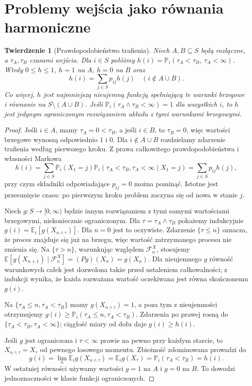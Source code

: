 \documentclass[11pt,a4paper,oneside]{report}
\numberwithin{equation}{chapter}
\theoremstyle{plain}
\newtheorem{twierdzenie}{Twierdzenie}[chapter]
\theoremstyle{definition}
\theoremstyle{remark}
\newcommand{\Prob}{\mathbb{P}}
\newcommand{\E}{\mathbb{E}}
\begin{document}
\section{Problemy wejścia jako równania harmoniczne}

\begin{twierdzenie}[Prawdopodobieństwo trafienia]
Niech $A,B\subseteq S$ będą rozłączne, a
$\tau_A,\tau_B$ czasami wejścia.
Dla $i\in S$ połóżmy
$h(i)=\Prob_i(\tau_A<\tau_B,\ \tau_A<\infty)$.
Wtedy $0\leq h\leq1$, $h=1$ na $A$,
$h=0$ na $B$ oraz
\[
h(i)=\sum_{j\in S}p_{ij}h(j)
\quad(i\notin A\cup B).
\]
Co więcej, $h$ jest \emph{najmniejszą}
nieujemną funkcją spełniającą te warunki brzegowe
i równanie na $S\setminus(A\cup B)$.
Jeśli $\Prob_i(\tau_A\wedge\tau_B<\infty)=1$
dla wszystkich $i$, to $h$ jest jedynym
ograniczonym rozwiązaniem układu z tymi
warunkami brzegowymi.
\end{twierdzenie}
\begin{proof}
Jeśli $i\in A$, mamy $\tau_A=0<\tau_B$,
a jeśli $i\in B$, to $\tau_B=0$,
więc wartości brzegowe wynoszą odpowiednio $1$ i $0$.
Dla $i\notin A\cup B$ rozdzielamy zdarzenie trafienia
według pierwszego kroku. Z prawa całkowitego
prawdopodobieństwa i własności Markowa
\[
 h(i)=\sum_{j\in S}\Prob_i(X_1=j)
 \Prob_i(\tau_A<\tau_B,\tau_A<\infty\mid X_1=j)
 =\sum_{j\in S}p_{ij}h(j),
\]
przy czym składniki odpowiadające $p_{ij}=0$
można pominąć. Istotne jest przesunięcie czasu:
po pierwszym kroku problem zaczyna się od nowa
w stanie $j$.

Niech $g:S\to[0,\infty)$ będzie innym rozwiązaniem
z tymi samymi wartościami brzegowymi, niekoniecznie
ograniczonym. Dla $\tau=\tau_A\wedge\tau_B$
pokażemy indukcyjnie
$g(i)=\E_i[g(X_{n\wedge\tau})]$.
Dla $n=0$ jest to oczywiste. Zdarzenie
$\{\tau\leq n\}$ oznacza, że proces znajduje się
już na brzegu, więc wartość zatrzymanego procesu
nie zmienia się. Na $\{\tau>n\}$, warunkując
względem $\mathcal F_n^X$, stosujemy
$\E[g(X_{n+1})\mid\mathcal F_n^X]=(Pg)(X_n)
=g(X_n)$. Dla nieujemnego $g$ równość
warunkowych całek jest dozwolona także przed
ustaleniem całkowalności; z indukcji wynika,
że każda rozważana wartość oczekiwana jest
równa skończonemu $g(i)$.

Na $\{\tau_A\leq n,\tau_A<\tau_B\}$ mamy
$g(X_{n\wedge\tau})=1$, a poza tym z
nieujemności otrzymujemy
$g(i)\geq\Prob_i(\tau_A\leq n,\tau_A<\tau_B)$.
Zdarzenia po prawej rosną do
$\{\tau_A<\tau_B,\tau_A<\infty\}$;
ciągłość miary od dołu daje $g(i)\geq h(i)$.

Jeśli $g$ jest ograniczona i $\tau<\infty$
prawie na pewno przy każdym starcie, to
$X_{n\wedge\tau}=X_\tau$ od pewnego losowego
momentu. Zbieżność zdominowana prowadzi do
\[
 g(i)=\lim_n\E_i g(X_{n\wedge\tau})
 =\E_i g(X_\tau)
 =\Prob_i(\tau_A<\tau_B)=h(i).
\]
W ostatniej równości używamy wartości $g=1$
na $A$ i $g=0$ na $B$. To dowodzi jednoznaczności
w klasie funkcji ograniczonych. 
\end{proof}
\end{document}
